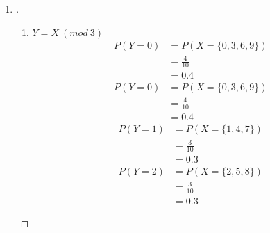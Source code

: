 \documentclass[paper=usletter, fontsize=12pt]{article}
\begin{document}
\begin{enumerate}
        \item
        \begin{proof}[\unskip\nopunct]

            \begin{enumerate}

                \item $Y = X \ (mod \ 3)$\\
                \begin{align*}
                    P(Y = 0) & = P(X = \{0,3,6,9\})\\
                    & = \frac{4}{10}\\
                    & = 0.4
                \end{align*}
                \begin{align*}
                    P(Y = 0) & = P(X = \{0,3,6,9\})\\
                    & = \frac{4}{10}\\
                    & = 0.4
                \end{align*}
                \begin{align*}
                    P(Y = 1) & = P(X = \{1,4,7\})\\
                    & = \frac{3}{10}\\
                    & = 0.3
                \end{align*}
                \begin{align*}
                    P(Y = 2) & = P(X = \{2,5,8\})\\
                    & = \frac{3}{10}\\
                    & = 0.3
                \end{align*}


\end{enumerate}
\end{proof}
\end{enumerate}
\end{document}
